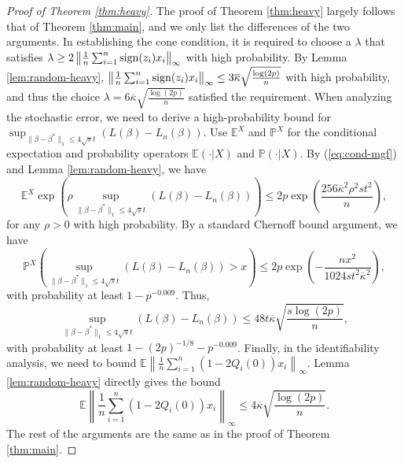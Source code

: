 \begin{proof}[Proof of Theorem \ref{thm:heavy}]
The proof of Theorem \ref{thm:heavy} largely follows that of Theorem \ref{thm:main}, and we only list the differences of the two arguments. In establishing the cone condition, it is required to choose a $\lambda$ that satisfies  $\lambda\geq 2\left\|\frac{1}{n}\sum_{i=1}^n\mathop{\rm sign}(z_i)x_i\right\|_{\infty}$ with high probability. By Lemma \ref{lem:random-heavy}, $\left\|\frac{1}{n}\sum_{i=1}^n\mathop{\rm sign}(z_i)x_i\right\|_{\infty}\leq 3\overline{\kappa}\sqrt{\frac{\log(2p)}{n}}$ with high probability, and thus the choice $\lambda=6\overline{\kappa}\sqrt{\frac{\log(2p)}{n}}$ satisfied the requirement. When analyzing the stochastic error, we need to derive a high-probability bound for $\sup_{\|\beta-\beta^*\|_1\leq 4\sqrt{s}t}(L(\beta)-L_n(\beta))$. Use $\mathbb{E}^X$ and $\mathbb{P}^X$ for the conditional expectation and probability operators $\mathbb{E}(\cdot|X)$ and $\mathbb{P}(\cdot|X)$. By (\ref{eq:cond-mgf}) and Lemma \ref{lem:random-heavy}, we have
$$\mathbb{E}^X\exp\left(\rho \sup_{\|\beta-\beta^*\|_1\leq 4\sqrt{s}t}(L(\beta)-L_n(\beta))\right)\leq 2p\exp\left(\frac{256\overline{\kappa}^2\rho^2st^2}{n}\right),$$
for any $\rho>0$ with high probability. By a standard Chernoff bound argument, we have
$$\mathbb{P}^X\left(\sup_{\|\beta-\beta^*\|_1\leq 4\sqrt{s}t}(L(\beta)-L_n(\beta)) > x\right)\leq 2p\exp\left(-\frac{nx^2}{1024st^2\overline{\kappa}^2}\right),$$
with probability at least $1-p^{-0.009}$. Thus,
$$\sup_{\|\beta-\beta^*\|_1\leq 4\sqrt{s}t}(L(\beta)-L_n(\beta))\leq 48t\overline{\kappa}\sqrt{\frac{s\log (2p)}{n}},$$
with probability at least $1-(2p)^{-1/8}-p^{-0.009}$. Finally, in the identifiability analysis, we need to bound $\mathbb{E}\left\|\frac{1}{n}\sum_{i=1}^n(1-2Q_i(0))x_i\right\|_{\infty}$. Lemma \ref{lem:random-heavy} directly gives the bound
$$\mathbb{E}\left\|\frac{1}{n}\sum_{i=1}^n(1-2Q_i(0))x_i\right\|_{\infty}\leq 4\overline{\kappa}\sqrt{\frac{\log(2p)}{n}}.$$
The rest of the arguments are the same as in the proof of Theorem \ref{thm:main}.
\end{proof}
